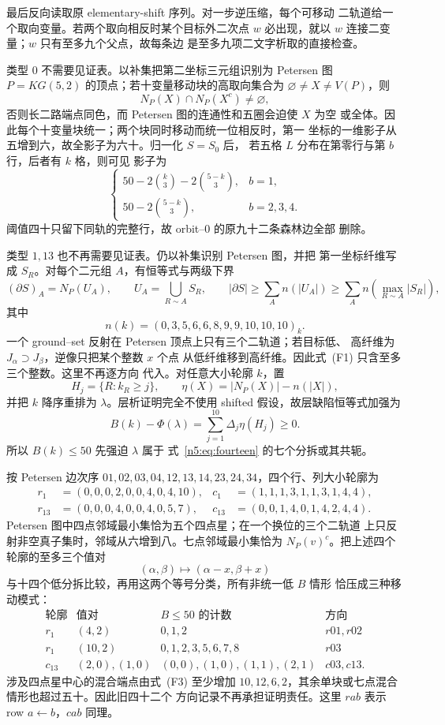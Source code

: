 最后反向读取原 elementary-shift 序列。对一步逆压缩，每个可移动
二轨道给一个取向变量。若两个取向相反时某个目标外二次点 \(w\)
必出现，就以 \(w\) 连接二变量；\(w\) 只有至多九个父点，故每条边
是至多九项二文字析取的直接检查。

类型 \(0\) 不需要见证表。以补集把第二坐标三元组识别为 Petersen 图
\(P=KG(5,2)\) 的顶点；若十变量移动块的高取向集合为
\(\varnothing\ne X\ne V(P)\)，则
\[
N_P(X)\cap N_P(X^c)\ne\varnothing,
\]
否则长二路端点同色，而 Petersen 图的连通性和五圈会迫使 \(X\) 为空
或全体。因此每个十变量块统一；两个块同时移动而统一位相反时，第一
坐标的一维影子从五增到六，故全影子为六十。归一化 \(S=S_0\) 后，
若五格 \(L\) 分布在第零行与第 \(b\) 行，后者有 \(k\) 格，则可见
影子为
\[
\begin{cases}
50-2\binom{k}{3}-2\binom{5-k}{3},&b=1,\\
50-2\binom{5-k}{3},&b=2,3,4.
\end{cases}
\]
阈值四十只留下同轨的完整行，故 orbit--0 的原九十二条森林边全部
删除。

类型 \(1,13\) 也不再需要见证表。仍以补集识别 Petersen 图，并把
第一坐标纤维写成 \(S_R\)。对每个二元组 \(A\)，有恒等式与两级下界
\[
(\partial S)_A=N_P(U_A),\qquad
U_A=\bigcup_{R\sim A}S_R,\qquad
|\partial S|\ge\sum_A n(|U_A|)\ge
\sum_A n\!\left(\max_{R\sim A}|S_R|\right),                 \tag{F1}
\]
其中
\[
n(k)=(0,3,5,6,6,8,9,9,10,10,10)_k.                         \tag{F2}
\]
一个 ground--set 反射在 Petersen 顶点上只有三个二轨道；若目标低、
高纤维为 \(J_\alpha\supset J_\beta\)，逆像只把某个整数 \(x\) 个点
从低纤维移到高纤维。因此式~(F1) 只含至多三个整数。这里不再逐方向
代入。对任意大小轮廓 \(k\)，置
\[
H_j=\{R:k_R\ge j\},\qquad
\eta(X)=|N_P(X)|-n(|X|),
\]
并把 \(k\) 降序重排为 \(\lambda\)。层析证明完全不使用 shifted
假设，故层缺陷恒等式加强为
\[
B(k)-\Phi(\lambda)
=\sum_{j=1}^{10}\Delta_j\eta(H_j)\ge0.                         \tag{F3}
\]
所以 \(B(k)\le50\) 先强迫 \(\lambda\) 属于
式~\eqref{n5:eq:fourteen} 的七个分拆或其共轭。

按 Petersen 边次序
\(01,02,03,04,12,13,14,23,24,34\)，四个行、列大小轮廓为
\[
\begin{aligned}
r_1&=(0,0,0,2,0,0,4,0,4,10),&
c_1&=(1,1,1,3,1,1,3,1,4,4),\\
r_{13}&=(0,0,0,4,0,0,4,0,5,7),&
c_{13}&=(0,0,1,4,0,1,4,2,4,4).
\end{aligned}
\]
Petersen 图中四点邻域最小集恰为五个四点星；在一个换位的三个二轨道
上只反射非空真子集时，邻域从六增到八。七点邻域最小集恰为
\(N_P(v)^c\)。把上述四个轮廓的至多三个值对
\[
(\alpha,\beta)\longmapsto(\alpha-x,\beta+x)
\]
与十四个低分拆比较，再用这两个等号分类，所有非统一低 \(B\) 情形
恰压成三种移动模式：
\[
\begin{array}{c|c|c|c}
\text{轮廓}&\text{值对}&B\le50\text{ 的计数}&\text{方向}\\ \hline
r_1&(4,2)&0,1,2&r01,r02\\
r_1&(10,2)&0,1,2,3,5,6,7,8&r03\\
c_{13}&(2,0),(1,0)&(0,0),(1,0),(1,1),(2,1)&c03,c13.
\end{array}
\]
涉及四点星中心的混合端点由式~(F3) 至少增加
\(10,12,6,2\)，其余单块或七点混合情形也超过五十。因此旧四十二个
方向记录不再承担证明责任。这里 \(rab\) 表示 row
\(a\leftarrow b\)，\(cab\) 同理。

